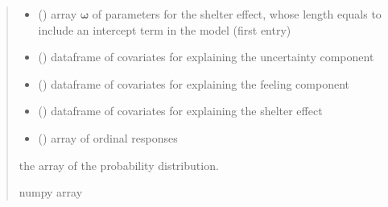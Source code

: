 \documentclass[letterpaper,10pt,english]{sphinxmanual}
\begin{document}
\begin{fulllineitems}
\begin{quote}
\begin{description}
\begin{itemize}
\item {} 
\sphinxAtStartPar
{} () \textendash{} array \(\pmb \omega\) of parameters for the shelter effect, whose length equals 
 to include an intercept term in the model (first entry)

\item {} 
\sphinxAtStartPar
{} () \textendash{} dataframe of covariates for explaining the uncertainty component

\item {} 
\sphinxAtStartPar
{} () \textendash{} dataframe of covariates for explaining the feeling component

\item {} 
\sphinxAtStartPar
{} () \textendash{} dataframe of covariates for explaining the shelter effect

\item {} 
\sphinxAtStartPar
{} () \textendash{} array of ordinal responses

\end{itemize}

\sphinxAtStartPar
the array of the probability distribution.

\sphinxAtStartPar
numpy array

\end{description}\end{quote}

\end{fulllineitems}

\end{document}
